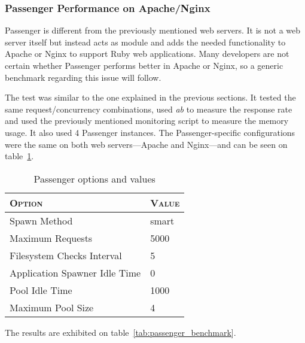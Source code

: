 \subsubsection{Passenger Performance on Apache/Nginx}
Passenger is different from the previously mentioned web servers. It is not a web server itself but instead acts as module and adds the needed functionality to Apache or Nginx to support Ruby web applications. Many developers are not certain whether Passenger performs better in Apache or Nginx, so a generic benchmark regarding this issue will follow.

The test was similar to the one explained in the previous sections. It tested the same request/concurrency combinations, used \textit{ab} to measure the response rate and used the previously mentioned monitoring script to measure the memory usage. It also used 4 Passenger instances. The Passenger-specific configurations were the same on both web servers---Apache and Nginx---and can be seen on table~\ref{tab:passenger4_configuration}.
\begin{table}[ht]
  \centering
  
  \begin{tabular}{p{}|p{}}
    \textsc{Option}
  & \textsc{Value} \\
  \hline
  Spawn Method & smart \\
  Maximum Requests & 5000 \\
  Filesystem Checks Interval & 5 \\
  Application Spawner Idle Time & 0 \\
  Pool Idle Time & 1000 \\
  Maximum Pool Size & 4 \\
  
  \end{tabular}
  \caption{Passenger options and values}
  \label{tab:passenger4_configuration}
\end{table}
The results are exhibited on table~\ref{tab:passenger_benchmark}.

